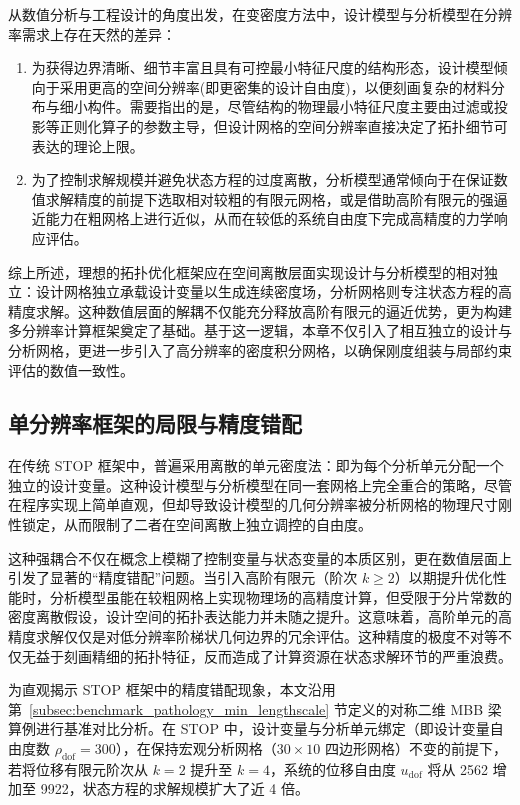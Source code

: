 从数值分析与工程设计的角度出发，在变密度方法中，设计模型与分析模型在分辨率需求上存在天然的差异：
\begin{enumerate}
	\item 为获得边界清晰、细节丰富且具有可控最小特征尺度的结构形态，设计模型倾向于采用更高的空间分辨率(即更密集的设计自由度)，以便刻画复杂的材料分布与细小构件。需要指出的是，尽管结构的物理最小特征尺度主要由过滤或投影等正则化算子的参数主导，但设计网格的空间分辨率直接决定了拓扑细节可表达的理论上限。
	
	\item 为了控制求解规模并避免状态方程的过度离散，分析模型通常倾向于在保证数值求解精度的前提下选取相对较粗的有限元网格，或是借助高阶有限元的强逼近能力在粗网格上进行近似，从而在较低的系统自由度下完成高精度的力学响应评估。
\end{enumerate}

综上所述，理想的拓扑优化框架应在空间离散层面实现设计与分析模型的相对独立：设计网格独立承载设计变量以生成连续密度场，分析网格则专注状态方程的高精度求解。这种数值层面的解耦不仅能充分释放高阶有限元的逼近优势，更为构建多分辨率计算框架奠定了基础。基于这一逻辑，本章不仅引入了相互独立的设计与分析网格，更进一步引入了高分辨率的密度积分网格，以确保刚度组装与局部约束评估的数值一致性。


\subsection{单分辨率框架的局限与精度错配}
\label{subsec:single_resolution_mismatch}

在传统 STOP 框架中，普遍采用离散的单元密度法：即为每个分析单元分配一个独立的设计变量。这种设计模型与分析模型在同一套网格上完全重合的策略，尽管在程序实现上简单直观，但却导致设计模型的几何分辨率被分析网格的物理尺寸刚性锁定，从而限制了二者在空间离散上独立调控的自由度。

这种强耦合不仅在概念上模糊了控制变量与状态变量的本质区别，更在数值层面上引发了显著的“精度错配”问题。当引入高阶有限元（阶次 $k \ge 2$）以期提升优化性能时，分析模型虽能在较粗网格上实现物理场的高精度计算，但受限于分片常数的密度离散假设，设计空间的拓扑表达能力并未随之提升。这意味着，高阶单元的高精度求解仅仅是对低分辨率阶梯状几何边界的冗余评估。这种精度的极度不对等不仅无益于刻画精细的拓扑特征，反而造成了计算资源在状态求解环节的严重浪费。

为直观揭示 STOP 框架中的精度错配现象，本文沿用第~\ref{subsec:benchmark_pathology_min_lengthscale} 节定义的对称二维 MBB 梁算例进行基准对比分析。在 STOP 中，设计变量与分析单元绑定（即设计变量自由度数 $\rho_{\text{dof}}=300$），在保持宏观分析网格（$30\times10$ 四边形网格）不变的前提下，若将位移有限元阶次从 $k=2$ 提升至 $k=4$，系统的位移自由度 $u_{\text{dof}}$ 将从 2562 增加至 9922，状态方程的求解规模扩大了近 4 倍。

